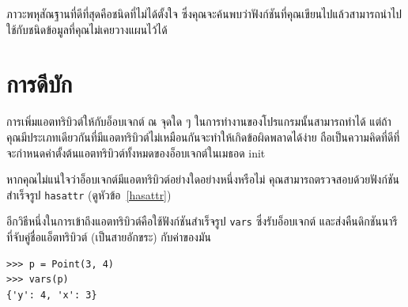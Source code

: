 ภาวะพหุสัณฐานที่ดีที่สุดคือชนิดที่ไม่ได้ตั้งใจ ซึ่งคุณจะค้นพบว่าฟังก์ชันที่คุณเขียนไปแล้วสามารถนำไปใช้กับชนิดข้อมูลที่คุณไม่เคยวางแผนไว้ได้

\section{การดีบัก}


การเพิ่มแอตทริบิวต์ให้กับอ็อบเจกต์ ณ จุดใด ๆ ในการทำงานของโปรแกรมนั้นสามารถทำได้ แต่ถ้าคุณมีประเภทเดียวกันที่มีแอตทริบิวต์ไม่เหมือนกันจะทำให้เกิดข้อผิดพลาดได้ง่าย
ถือเป็นความคิดที่ดีที่จะกำหนดค่าตั้งต้นแอตทริบิวต์ทั้งหมดของอ็อบเจกต์ในเมธอด init


หากคุณไม่แน่ใจว่าอ็อบเจกต์มีแอตทริบิวต์อย่างใดอย่างหนึ่งหรือไม่ คุณสามารถตรวจสอบด้วยฟังก์ชันสำเร็จรูป {\tt hasattr} (ดูหัวข้อ~\ref{hasattr})


อีกวิธีหนึ่งในการเข้าถึงแอตทริบิวต์คือใช้ฟังก์ชันสำเร็จรูป {\tt vars} ซึ่งรับอ็อบเจกต์
และส่งคืนดิกชันนารี
ที่จับคู่ชื่อแอ็ตทริบิวต์ (เป็นสายอักขระ) กับค่าของมัน

\begin{verbatim}
>>> p = Point(3, 4)
>>> vars(p)
{'y': 4, 'x': 3}
\end{verbatim}
%

